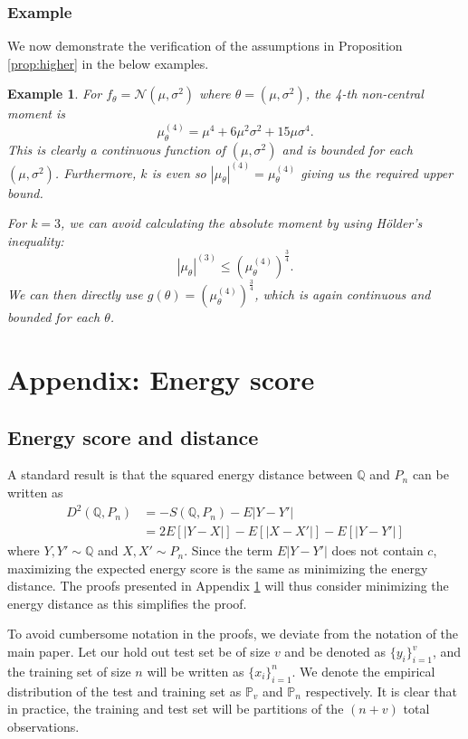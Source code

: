 \documentclass[11pt,a4paper]{article}
\theoremstyle{plain}
\newtheorem{example}{Example}
\theoremstyle{remark}
\theoremstyle{remark}
\begin{document}
\subsubsection{Example}
 We now demonstrate the verification of the assumptions in Proposition \ref{prop:higher} in the below examples.
\begin{example}
For $f_\theta = \mathcal{N}(\mu,\sigma^2)$ where $\theta = (\mu,\sigma^2)$, the 4-th non-central moment is
$$
\mu_\theta^{(4)} = \mu^4 + 6\mu^2 \sigma^2 + 15 \mu \sigma^4.
$$
This is clearly a continuous function of $(\mu,\sigma^2)$ and is bounded for each $(\mu,\sigma^2)$. Furthermore, $k$ is even so $|\mu_\theta|^{(4)} = \mu_\theta^{(4)}$ giving us the required upper bound.

For $k = 3$, we can avoid calculating the absolute moment by using H\"{o}lder's inequality:
$$
|\mu_{\theta}|^{(3)} \leq \left(\mu_\theta^{(4)}\right)^{\frac{3}{4}}.
$$
We can then directly use $g(\theta) = (\mu_\theta^{(4)})^{\frac{3}{4}}$, which is again continuous and bounded for each $\theta$.
\label{exp3}
\end{example}\vspace{10mm}

\setcounter{prop}{0}
\setcounter{corollary}{0}
\setcounter{theorem}{0}
\setcounter{lemma}{0}
\setcounter{algorithm}{0}
\setcounter{equation}{0}
\setcounter{figure}{0}
\setcounter{table}{0}
\setcounter{example}{0}
\section{Appendix: Energy score} \label{sec:app_energy}
\subsection{Energy score and distance}\label{sec:app_lam}
A standard result is that the squared energy distance between $\mathbb{Q}$ and $P_n$ can be written as
\begin{align*}
D^2(\mathbb{Q},P_n) &= - S(\mathbb{Q},P_n)-E|Y-Y'|\\
    &= 2E[|Y-X|] - E[|X-X'|]  -  E[|Y-Y'|] 
\end{align*}
where $Y,Y'\sim \mathbb{Q}$ and $X,X'\sim P_n$. Since the term $E|Y-Y'|$ does not contain $c$, maximizing the expected energy score is the same as minimizing the energy distance. The proofs presented in  Appendix \ref{sec:app_energy} will thus consider minimizing the energy distance as this simplifies the proof.

To avoid cumbersome notation in the proofs, we deviate from the notation of the main paper. Let our hold out test set be of size $v$ and be denoted as $\{{y}_i\}_{i = 1}^v$, and the training set of size $n$ will be written as $\{x_i\}_{i = 1}^n$. We denote the empirical distribution of the test and training set as $\mathbb{P}_v$ and $\mathbb{P}_n$ respectively.
It is clear that in practice, the training and test set will be partitions of the $(n+v)$ total observations.
\end{document}
